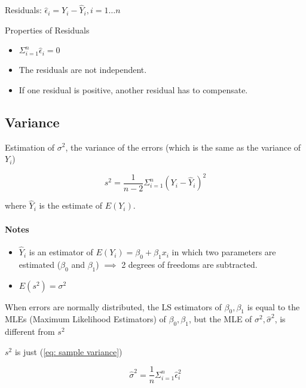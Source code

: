 \documentclass[10pt]{article}
\newcommand{\hlDef}[1]{\colorbox{Thistle2}{#1}}
\begin{document}
\begin{multicols}{3}
    \hlDef{Residuals}: $\hat\epsilon_i = Y_i - \hat Y_i, i=1\dots n$

    Properties of Residuals

    \begin{itemize}
        \item $\Sigma_{i=1}^{n} \hat\epsilon_i = 0$
        \item The residuals are not independent.
        \item If one residual is positive, another residual has to compensate.
    \end{itemize}



    \subsection{Variance}

    Estimation of $\sigma^2$, the variance of the errors (which is the same as the variance of $Y_i$)

    \begin{equation}\label{eq: sample variance}
        s^2 = \frac{1}{n-2} \Sigma_{i=1}^{n} (Y_i - \hat Y_i)^2
    \end{equation}

    where $\hat Y_i$ is the estimate of $E(Y_i)$.

    \paragraph{Notes}

    \begin{itemize}
        \item $\hat Y_i$ is an estimator of $E(Y_i) = \beta_0 + \beta_1 x_i$ in which two parameters are estimated ($\beta_0$  and $\beta_1$) $\implies$ 2 degrees of freedoms are subtracted.
        \item $E(s^2) = \sigma^2$
    \end{itemize}

    When errors are normally distributed, the LS estimators of $\beta_0, \beta_1$ is equal to the MLEs (Maximum Likelihood Estimators) of $\beta_0, \beta_1$, but the MLE of $\sigma^2, \hat\sigma^2$, is different from $s^2$

    $s^2$ is just (\ref{eq: sample variance})

    \begin{equation}
        \hat\sigma^2 = \frac{1}{n} \Sigma_{i=1}^n \hat\epsilon_i^2
    \end{equation}




\end{multicols}
\end{document}
